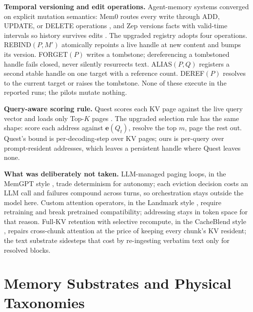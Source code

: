 \documentclass[runningheads]{llncs}
\begin{document}
\noindent\textbf{Temporal versioning and edit operations.} Agent-memory systems converged on explicit mutation semantics: Mem0 routes every write through ADD, UPDATE, or DELETE operations \cite{chhikara2025mem0}, and Zep versions facts with valid-time intervals so history survives edits \cite{rasmussen2025zep}. The upgraded registry adopts four operations. REBIND$(P, M')$ atomically repoints a live handle at new content and bumps its version. FORGET$(P)$ writes a tombstone; dereferencing a tombstoned handle fails closed, never silently resurrects text. ALIAS$(P, Q)$ registers a second stable handle on one target with a reference count. DEREF$(P)$ resolves to the current target or raises the tombstone. None of these execute in the reported runs; the pilots mutate nothing.

\noindent\textbf{Query-aware scoring rule.} Quest scores each KV page against the live query vector and loads only Top-$K$ pages \cite{tang2024quest}. The upgraded selection rule has the same shape: score each address against $\mathbf{e}(Q_t)$, resolve the top $m$, page the rest out. Quest's bound is per-decoding-step over KV pages; ours is per-query over prompt-resident addresses, which leaves a persistent handle where Quest leaves none.

\noindent\textbf{What was deliberately not taken.} LLM-managed paging loops, in the MemGPT style \cite{packer2023memgpt}, trade determinism for autonomy; each eviction decision costs an LLM call and failures compound across turns, so orchestration stays outside the model here. Custom attention operators, in the Landmark style \cite{mohtashami2023landmark}, require retraining and break pretrained compatibility; addressing stays in token space for that reason. Full-KV retention with selective recompute, in the CacheBlend style \cite{yao2025cacheblend}, repairs cross-chunk attention at the price of keeping every chunk's KV resident; the text substrate sidesteps that cost by re-ingesting verbatim text only for resolved blocks.

\section{Memory Substrates and Physical Taxonomies}\label{sec:substrates}
\end{document}

